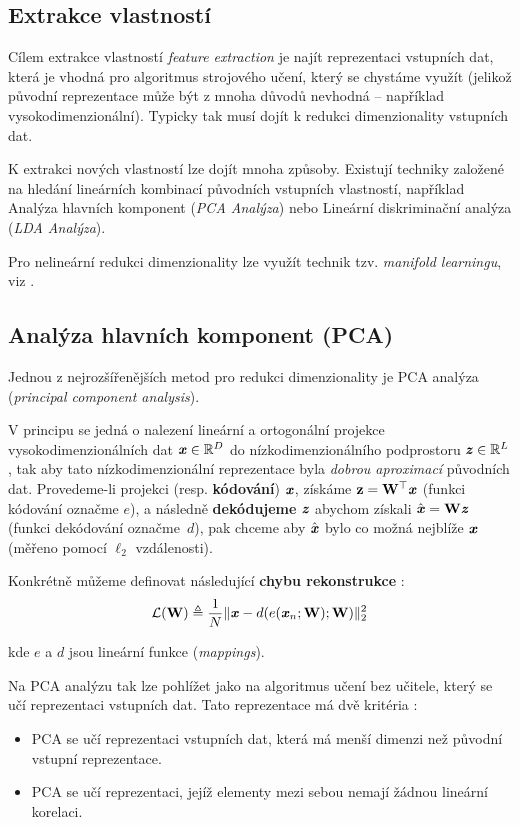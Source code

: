 \subsection{Extrakce vlastností}
\label{sec:feature_extraction}
Cílem extrakce vlastností \emph{feature extraction} je najít reprezentaci vstupních dat, která je vhodná pro algoritmus strojového učení, který se chystáme využít (jelikož původní reprezentace může být z mnoha důvodů nevhodná – například vysokodimenzionální).
Typicky tak musí dojít k redukci dimenzionality vstupních dat. \cite{Liu1998}

K extrakci nových vlastností lze dojít mnoha způsoby.
Existují techniky založené na hledání lineárních kombinací původních vstupních vlastností, například Analýza hlavních komponent (\emph{PCA Analýza}) nebo Lineární diskriminační analýza (\emph{LDA Analýza}).

Pro nelineární redukci dimenzionality lze využít technik tzv. \emph{manifold learningu}, viz \cite[kap. 5.11.3.]{Goodfellow2016}. 


\subsection{Analýza hlavních komponent (PCA)}
\label{sec:pca}
Jednou z nejrozšířenějších metod pro redukci dimenzionality je PCA analýza (\emph{principal component analysis}).

V principu se jedná o nalezení lineární a ortogonální projekce vysokodimenzionálních dat $\textbf{\emph{x}} \in \mathbb{R}^D$ do nízkodimenzionálního podprostoru  $\textbf{\emph{z}} \in \mathbb{R}^L$,
tak aby tato nízkodimenzionální reprezentace byla \emph{dobrou aproximací} původních dat.
Provedeme-li projekci (resp. \textbf{kódování}) $\textbf{\emph{x}}$, získáme $\mathbf{z} = \mathbf{W^{\top}} \textbf{\emph{x}}$ (funkci kódování označme $e$),
a následně \textbf{dekódujeme} $\textbf{\emph{z}}$ abychom získali $\hat{\textbf{\emph{x}}} = \mathbf{W}\textbf{\emph{z}}$ (funkci dekódování označme $d$),
pak chceme aby $\hat{\textbf{\emph{x}}}$ bylo co možná nejblíže $\textbf{\emph{x}}$ (měřeno pomocí $\ell_2$ vzdálenosti). \cite{Murphy2022}

Konkrétně můžeme definovat následující \textbf{chybu rekonstrukce} \cite{Murphy2022}:
\begin{equation}
    \mathcal{L}(\mathbf{W}) \triangleq \frac{1}{N} \| \textbf{\emph{x}} - d(e(\textbf{\emph{x}}_n; \mathbf{W}); \mathbf{W})\|^2_2
\end{equation}

kde $e$ a $d$ jsou lineární funkce (\emph{mappings}).

Na PCA analýzu tak lze pohlížet jako na algoritmus učení bez učitele, který se učí reprezentaci vstupních dat. Tato reprezentace má dvě kritéria \cite{Goodfellow2016}:

\begin{itemize}
    \item PCA se učí reprezentaci vstupních dat, která má menší dimenzi než původní vstupní reprezentace.
    \item PCA se učí reprezentaci, jejíž elementy mezi sebou nemají žádnou lineární korelaci.
\end{itemize}
